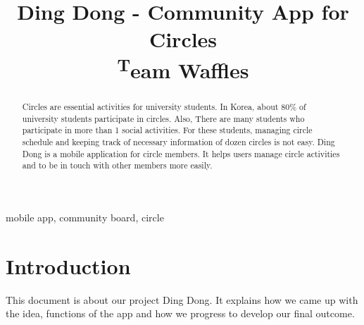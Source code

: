 \documentclass[conference]{IEEEtran}
\begin{document}
\title{Ding Dong - Community App for Circles \\
{\footnotesize \textsuperscript Team Waffles}
}

\author{
\and
{}
\and
{}
}

\maketitle

\begin{abstract}
Circles are essential activities for university students. In Korea, about 80\% of university students participate in circles. Also, There are many students who participate in more than 1 social activities. For these students, managing circle schedule and keeping track of necessary information of dozen circles is not easy. Ding Dong is a mobile application for circle members. It helps users manage circle activities and to be in touch with other members more easily.
\end{abstract}

\begin{IEEEkeywords}
mobile app, community board, circle
\end{IEEEkeywords}

\section{Introduction}
This document is about our project Ding Dong. It explains how we came up with the idea, functions of the app and how we progress to develop our final outcome.
\end{document}
